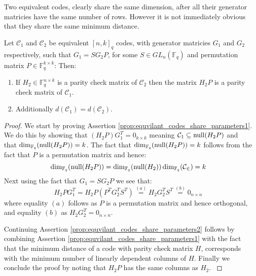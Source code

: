 Two equivalent codes, clearly share the same dimension, after all their generator matricies have the same number of rows. However it is not immediately obvious that they share the same minimum distance.
\begin{proposition}\label{prop:equvilant_codes_share_parameters}
  Let $\mathcal{C}_1$ and $\mathcal{C}_2$ be equivalent $[n, k]_q$ codes, with generator matricies $G_1$ and $G_2$ respectively, such that $G_1 = SG_2P$, for some $S \in GL_n(\mathbb{F}_q)$ and permutation matrix $P \in \mathbb{F}_q^{k \times k}$: Then:
  \begin{enumerate}
    \item If $H_2 \in \mathbb{F}_q^{n \times k}$ is a parity check matrix of $\mathcal{C}_2$ then the matrix $H_2 P$ is a parity check matrix of $\mathcal{C}_{1}$. \label{prop:equvilant_codes_share_parameters1}
    \item Additionally $d(\mathcal{C}_1) = d(\mathcal{C}_2)$. \label{prop:equvilant_codes_share_parameters2}
  \end{enumerate}
\end{proposition}
\begin{proof}
  We start by proving Assertion \ref{prop:equvilant_codes_share_parameters1}. We do this by showing that $(H_2P)G_1^T = 0_{k \times k}$ meaning $\mathcal{C}_1 \subseteq \textnormal{null}(H_2P)$ and that $\dim_{\mathbb{F}_q}(\textnormal{null}(H_2P)) = k$.
  The fact that $\dim_{\mathbb{F}_q}(\textnormal{null}(H_2P)) = k$ follows from the fact that $P$ is a permutation matrix and hence:
  \begin{equation*}
    \dim_{\mathbb{F}_q}(\textnormal{null}(H_2P)) = \dim_{\mathbb{F}_q}(\textnormal{null}(H_{2})) \dim_{\mathbb{F}_q} (\mathcal{C_{2}}) = k
  \end{equation*}
  Next using the fact that $G_1 = SG_2P$ we see that:
  \begin{equation*}
    H_2PG_1^{T} = H_2P(P^TG_2^TS^T) \overset{(a)}{=} H_2G_2^TS^T \overset{(b)}{=} 0_{n \times n}
  \end{equation*}
  where equality $(a)$ follows as $P$ is a permutation matrix and hence orthogonal, and equality $(b)$ as $H_2G_{2}^{T} = 0_{n \times n}$.

  Continuing Assertion \ref{prop:equvilant_codes_share_parameters2} follows by combining Assertion \ref{prop:equvilant_codes_share_parameters1} with the fact that the minimum distance of a code with parity check matrix $H$, corresponds with the minimum number of linearly dependent columns of $H$. Finally we conclude the proof by noting that $H_2P$ has the same columns as $H_2$.
  \label{}
\end{proof}
